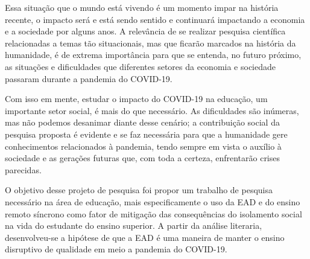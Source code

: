 \documentclass[
	arial,
	12pt,				%
	openright,			%
	oneside,
	a4paper,			%
	chapter=TITLE,		%
	english,			%
	french,				%
	spanish,			%
	brazil,				%
	]{abntex2}
\begin{document}
Essa situação que o mundo está vivendo é um momento impar na história recente, o impacto será e está sendo sentido e continuará impactando a economia e a sociedade por alguns anos. A relevância de se realizar pesquisa científica 
relacionadas a temas tão situacionais, mas que ficarão marcados na história da humanidade, é de extrema importância para que se entenda, no futuro próximo, as situações e dificuldades que diferentes setores da economia e sociedade passaram
durante a pandemia do COVID-19. 

Com isso em mente, estudar o impacto do COVID-19 na educação, um importante setor social, é mais do que necessário. As dificuldades são inúmeras, mas não podemos desanimar diante desse cenário; a contribuição social da pesquisa proposta é evidente e se faz necessária para que a humanidade gere conhecimentos relacionados à pandemia, tendo sempre em vista o auxílio à sociedade e as gerações futuras que, com toda a certeza, enfrentarão crises parecidas. 

O objetivo desse projeto de pesquisa foi propor um trabalho de pesquisa necessário na área de educação, mais especificamente o uso da EAD e do ensino remoto síncrono como fator de mitigação das consequências do isolamento social na vida do estudante do ensino superior. A partir da análise literaria, desenvolveu-se a hipótese de que a EAD é uma maneira de manter o ensino disruptivo de qualidade em meio a pandemia do COVID-19.



\postextual



%
%


\end{document}
